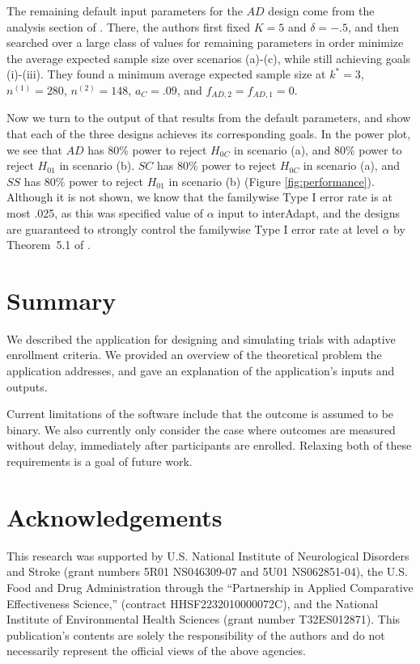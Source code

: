 \documentclass[article]{jss}
\begin{document}
The remaining default input parameters for the $AD$ design come from the analysis section of \citep{Rosenblum2013AdaptMISTIE}. There, the authors first fixed $K=5$ and $δ=-.5$, and then searched over a large class of values for remaining parameters in order minimize the average expected sample size over scenarios (a)-(c), while still achieving goals (i)-(iii). They found a minimum average expected sample size at $k^*=3$, $n^{(1)}=280$, $n^{(2)}=148$, $a_C = .09$, and $f_{AD,2}=f_{AD,1}=0$. %

Now we turn to the output of  that results from the default parameters, and show that each of the three designs achieves its corresponding goals. In the power plot, we see that $AD$ has 80\% power to reject $H_{0C}$ in scenario (a), and 80\% power to reject $H_{01}$ in scenario (b). $SC$ has 80\% power to reject $H_{0C}$ in scenario (a), and $SS$ has 80\% power to reject $H_{01}$ in scenario (b) (Figure \ref{fig:performance}). Although it is not shown, we know that the familywise Type I error rate is at most  .025, as this was specified value of $\alpha$ input to \textsf{interAdapt}, and the designs are guaranteed to strongly control the familywise Type I error rate at level $\alpha$ by
 Theorem~5.1 of  \citep{Rosenblum2013AdaptMISTIE}.


\section*{Summary}
\label{sec:Summary}

We described the  application for designing and simulating trials with adaptive enrollment criteria. We provided an overview of the theoretical problem the application addresses, and gave an explanation of the application's inputs and outputs.

Current limitations of the software include that the outcome is assumed to be binary. We also currently only consider the case where outcomes are measured without delay, immediately after participants are enrolled. Relaxing both of these requirements is a goal of future work.


\section*{Acknowledgements}
\label{sec:acknowledgements}
This research was supported by U.S. National Institute of Neurological Disorders and Stroke (grant numbers 5R01 NS046309-07 and 5U01 NS062851-04), the U.S. Food and Drug Administration through the ``Partnership in Applied Comparative Effectiveness Science,'' (contract HHSF2232010000072C), and the National Institute of Environmental Health Sciences (grant number T32ES012871). This publication's contents are solely the responsibility of the authors and do not necessarily represent the official views of the above agencies.



 
\end{document}
